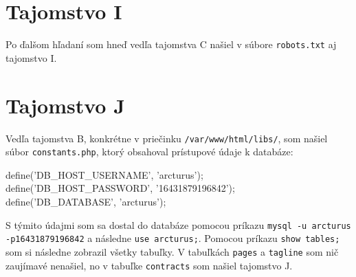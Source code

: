 \documentclass[]{article}
\begin{document}
\section*{Tajomstvo I}
Po ďalšom hľadaní som hneď vedľa tajomstva C našiel v súbore \texttt{robots.txt} aj tajomstvo I.

\section*{Tajomstvo J}
Vedľa tajomstva B, konkrétne v priečinku \texttt{/var/www/html/libs/}, som našiel súbor \texttt{constants.php}, ktorý obsahoval prístupové údaje k databáze:

\begin{framed}
\noindent define('DB\_HOST\_USERNAME', 'arcturus');\\
define('DB\_HOST\_PASSWORD', '16431879196842');\\
define('DB\_DATABASE', 'arcturus');
\end{framed} 

S týmito údajmi som sa dostal do databáze pomocou príkazu \texttt{mysql -u arcturus -p16431879196842} a následne \texttt{use arcturus;}. Pomocou príkazu \texttt{show tables;} som si následne zobrazil všetky tabuľky. V tabuľkách \texttt{pages} a \texttt{tagline} som nič zaujímavé nenašiel, no v tabuľke \texttt{contracts} som našiel tajomstvo J.
\end{document}
